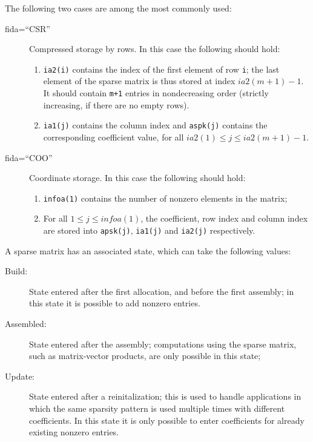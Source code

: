 The following two cases are among the most commonly used: 
\begin{description}
\item[fida=``CSR''] Compressed storage by rows. In this case the
following should hold: 
\begin{enumerate}
\item \verb|ia2(i)| contains the index of the first element of row
\verb|i|; the last element of the sparse matrix is thus stored at
index $ia2(m+1)-1$. It should contain \verb|m+1| entries in
nondecreasing order (strictly increasing, if there are no empty rows).
\item \verb|ia1(j)| contains the column index and \verb|aspk(j)|
contains the corresponding coefficient value, for all $ia2(1) \le j
\le ia2(m+1)-1$.
\end{enumerate}
\item[fida=``COO''] Coordinate storage. In this case the following
should hold: 
\begin{enumerate}
\item \verb|infoa(1)| contains the number of nonzero elements in the
matrix; 
\item For all $1 \le j \le infoa(1)$, the coefficient, row index and
column index are stored into \verb|apsk(j)|, \verb|ia1(j)| and
\verb|ia2(j)| respectively. 
\end{enumerate}
\end{description}
A sparse matrix has an associated state, which can take the following
values:
\begin{description}
\item[Build:] State entered after the first allocation, and before the
  first assembly; in this state it is possible to add nonzero entries.
\item[Assembled:] State entered after the assembly; computations using
  the sparse matrix, such as matrix-vector products, are only possible
  in this state;
\item[Update:] State entered after a reinitalization; this is used to
  handle applications in which the same sparsity pattern is used
  multiple times with different coefficients. In this state it is only
  possible to enter coefficients for already existing nonzero entries.
\end{description}

